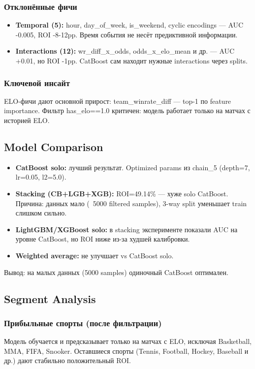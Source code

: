 \documentclass[12pt,a4paper]{article}
\begin{document}
\subsubsection{Отклонённые фичи}
\begin{itemize}
  \item \textbf{Temporal (5):} hour, day\_of\_week, is\_weekend, cyclic encodings — AUC -0.005, ROI -8-12pp. Время события не несёт предиктивной информации.
  \item \textbf{Interactions (12):} wr\_diff\_x\_odds, odds\_x\_elo\_mean и др. — AUC +0.01, но ROI -1pp. CatBoost сам находит нужные interactions через splits.
\end{itemize}

\subsubsection{Ключевой инсайт}
ELO-фичи дают основной прирост: team\_winrate\_diff — top-1 по feature importance. Фильтр has\_elo==1.0 критичен: модель работает только на матчах с историей ELO.

\subsection{Model Comparison}
\begin{itemize}
  \item \textbf{CatBoost solo:} лучший результат. Optimized params из chain\_5 (depth=7, lr=0.05, l2=5.0).
  \item \textbf{Stacking (CB+LGB+XGB):} ROI=49.14\% — хуже solo CatBoost. Причина: данных мало (~5000 filtered samples), 3-way split уменьшает train слишком сильно.
  \item \textbf{LightGBM/XGBoost solo:} в stacking эксперименте показали AUC на уровне CatBoost, но ROI ниже из-за худшей калибровки.
  \item \textbf{Weighted average:} не улучшает vs CatBoost solo.
\end{itemize}

Вывод: на малых данных (5000 samples) одиночный CatBoost оптимален.

\subsection{Segment Analysis}

\subsubsection{Прибыльные спорты (после фильтрации)}
Модель обучается и предсказывает только на матчах с ELO, исключая Basketball, MMA, FIFA, Snooker. Оставшиеся спорты (Tennis, Football, Hockey, Baseball и др.) дают стабильно положительный ROI.
\end{document}
